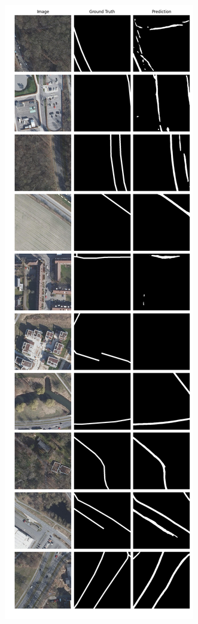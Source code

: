 \begin{figure}[h]
	\centering
	\begin{subfigure}{.4\textwidth}
		\centering
		\includegraphics[width=1.\textwidth]{Bilder/wolfsburg-color-samples/rbunet-l.png}

\end{subfigure}
\end{figure}

